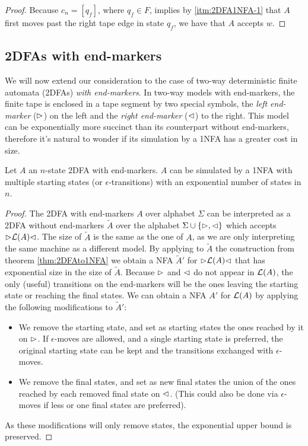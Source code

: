 \begin{proof}
	Because $c_n=[q_f]$, where $q_f\in F$, implies by \ref{itm:2DFA1NFA-1} that $A$ first moves past the right tape edge in state $q_f$, we have that $A$ accepts $w$.
\end{proof}


\subsection{2DFAs with end-markers}
We will now extend our consideration to the case of two-way deterministic finite automata (2DFAs) \emph{with end-markers}.
In two-way models with end-markers, the finite tape is enclosed in a tape segment by two special symbols, the \emph{left end-marker} ($\rhd$) on the left and the \emph{right end-marker} ($\lhd$) to the right.
This model can be exponentially more succinct than its counterpart without end-markers, therefore it's natural to wonder if its simulation by a 1NFA has a greater cost in size.

\begin{thrm}
	Let $A$ an $n$-state 2DFA with end-markers. $A$ can be simulated by a 1NFA with multiple starting states (or $\epsilon$-transitions) with an exponential number of states in $n$.
\end{thrm}
\begin{proof}
	The 2DFA with end-markers $A$ over alphabet $\Sigma$ can be interpreted as a 2DFA without end-markers $\tilde A$ over the alphabet $\Sigma\cup\{\rhd,\lhd\}$ which accepts $\rhd\mathcal L(A)\lhd$.
	The size of $\tilde A$ is the same as the one of $A$, as we are only interpreting the same machine as a different model.
	By applying to $\tilde A$ the construction from theorem \ref{thm:2DFAto1NFA} we obtain a NFA $\tilde A'$ for $\rhd\mathcal L(A)\lhd$ that has exponential size in the size of $\tilde A$.
	Because $\rhd$ and $\lhd$ do not appear in $\mathcal L(A)$, the only (useful) transitions on the end-markers will be the ones leaving the starting state or reaching the final states.
	We can obtain a NFA $A'$ for $\mathcal L(A)$ by applying the following modifications to $\tilde A'$:
	\begin{itemize}
		\item We remove the starting state, and set as starting states the ones reached by it on $\rhd$. If $\epsilon$-moves are allowed, and a single starting state is preferred, the original starting state can be kept and the transitions exchanged with $\epsilon$-moves.
		\item We remove the final states, and set as new final states the union of the ones reached by each removed final state on $\lhd$. (This could also be done via $\epsilon$-moves if less or one final states are preferred).
	\end{itemize}

	As these modifications will only remove states, the exponential upper bound is preserved.
\end{proof}
